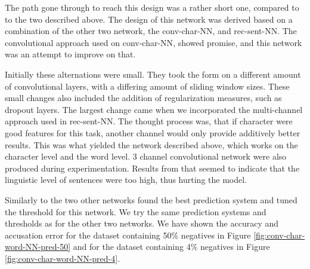 The path gone through to reach this design was a rather short one, compared
to to the two described above. The design of this network was derived based
on a combination of the other two network, the \gls{conv-char-NN}, and
\gls{rec-sent-NN}. The convolutional approach used on \gls{conv-char-NN},
showed promise, and this network was an attempt to improve on that.

Initially these alternations were small. They took the form on a different
amount of convolutional layers, with a differing amount of sliding window sizes.
These small changes also included the addition of regularization measures,
such as dropout layers. The largest change came when we incorporated the
multi-channel approach used in \gls{rec-sent-NN}. The thought process was,
that if character were good features for this task, another channel would
only provide additively better results. This was what yielded the network
described above, which works on the character level and the word level. 3
channel convolutional network were also produced during experimentation. Results
from that seemed to indicate that the linguistic level of sentences were too
high, thus hurting the model.

Similarly to the two other networks found the best prediction system and
tuned the threshold for this network. We try the same prediction systems
and thresholds as for the other two networks. We have shown the accuracy
and accusation error for the dataset containing 50\% negatives in Figure
\ref{fig:conv-char-word-NN-pred-50} and for the dataset containing 4\% negatives
in Figure \ref{fig:conv-char-word-NN-pred-4}.

